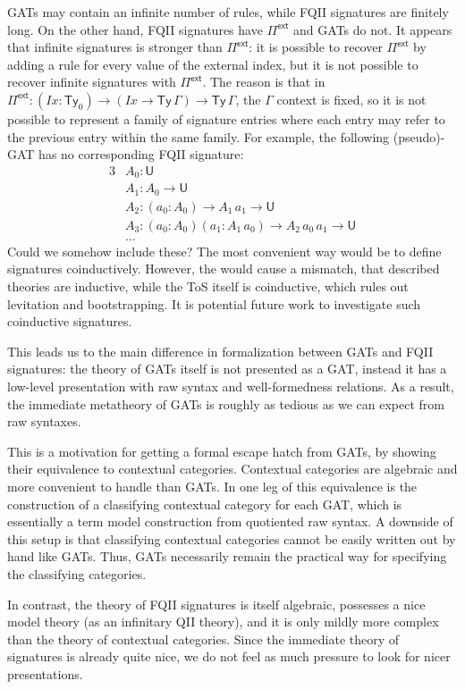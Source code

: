 \documentclass[12pt,a4paper,twoside,openany]{book}
\theoremstyle{remark}
\theoremstyle{definition}
\theoremstyle{theorem}
\newcommand{\mi}[1]{\mathit{#1}}
\newcommand{\Ty}{\mathsf{Ty}}
\newcommand{\U}{\mathsf{U}}
\newcommand{\Pie}{\Pi^{\mathsf{ext}}}
\begin{document}
GATs may contain an infinite number of rules, while FQII signatures are finitely
long. On the other hand, FQII signatures have $\Pie$ and GATs do not. It appears
that infinite signatures is stronger than $\Pie$: it is possible to recover
$\Pie$ by adding a rule for every value of the external index, but it is not
possible to recover infinite signatures with $\Pie$. The reason is that in $\Pie
: (\mi{Ix} : \Ty_0) \to (\mi{Ix} \to \Ty\,\Gamma) \to \Ty\,\Gamma$, the $\Gamma$
context is fixed, so it is not possible to represent a family of signature entries
where each entry may refer to the previous entry within the same family. For example,
the following (pseudo)-GAT has no corresponding FQII signature:
\begin{alignat*}{3}
  &A_0 : \U\\
  &A_1 : A_0 \to \U\\
  &A_2 : (a_0 : A_0) \to A_1\,a_1 \to \U\\
  &A_3 : (a_0 : A_0)(a_1 : A_1\,a_0) \to A_2\,a_0\,a_1 \to \U\\
  &...
\end{alignat*}
Could we somehow include these? The most convenient way would be to define
signatures coinductively. However, the would cause a mismatch, that described
theories are inductive, while the ToS itself is coinductive, which rules out
levitation and bootstrapping. It is potential future work to investigate such
coinductive signatures.

This leads us to the main difference in formalization between GATs and FQII
signatures: the theory of GATs itself is not presented as a GAT, instead it has
a low-level presentation with raw syntax and well-formedness relations. As a
result, the immediate metatheory of GATs is roughly as tedious as we can expect
from raw syntaxes.

This is a motivation for getting a formal escape hatch from GATs, by showing
their equivalence to contextual categories. Contextual categories are algebraic
and more convenient to handle than GATs. In \cite{cartmellthesis} one leg of
this equivalence is the construction of a classifying contextual category for
each GAT, which is essentially a term model construction from quotiented raw
syntax. A downside of this setup is that classifying contextual categories
cannot be easily written out by hand like GATs. Thus, GATs necessarily remain
the practical way for specifying the classifying categories.

In contrast, the theory of FQII signatures is itself algebraic, possesses a nice
model theory (as an infinitary QII theory), and it is only mildly more complex
than the theory of contextual categories. Since the immediate theory of
signatures is already quite nice, we do not feel as much pressure to look for
nicer presentations.
\end{document}
